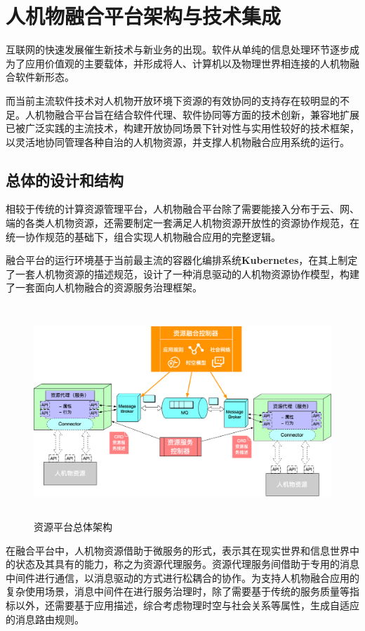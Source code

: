 \documentclass[a4paper, 12pt]{article}
\theoremstyle{definition}
\begin{document}
\section{人机物融合平台架构与技术集成} 

互联网的快速发展催生新技术与新业务的出现。软件从单纯的信息处理环节逐步成为了应用价值观的主要载体，并形成将人、计算机以及物理世界相连接的人机物融合软件新形态。

而当前主流软件技术对人机物开放环境下资源的有效协同的支持存在较明显的不足。人机物融合平台旨在结合软件代理、软件协同等方面的技术创新，兼容地扩展已被广泛实践的主流技术，构建开放协同场景下针对性与实用性较好的技术框架，以灵活地协同管理各种自治的人机物资源，并支撑人机物融合应用系统的运行。

\subsection{总体的设计和结构}

相较于传统的计算资源管理平台，人机物融合平台除了需要能接入分布于云、网、端的各类人机物资源，还需要制定一套满足人机物资源开放性的资源协作规范，在统一协作规范的基础下，组合实现人机物融合应用的完整逻辑。

融合平台的运行环境基于当前最主流的容器化编排系统\textbf{Kubernetes}，在其上制定了一套人机物资源的描述规范，设计了一种消息驱动的人机物资源协作模型，构建了一套面向人机物融合的资源服务治理框架。

\begin{figure}[ht]
 \centering
 \includegraphics[height=8cm]{images/overview_arch.jpg}
 \caption{资源平台总体架构}
 \label{fig:singleblock}
\end{figure}

在融合平台中，人机物资源借助于微服务的形式，表示其在现实世界和信息世界中的状态及其具有的能力，称之为资源代理服务。资源代理服务间借助于专用的消息中间件进行通信，以消息驱动的方式进行松耦合的协作。为支持人机物融合应用的复杂使用场景，消息中间件在进行服务治理时，除了需要基于传统的服务质量等指标以外，还需要基于应用描述，综合考虑物理时空与社会关系等属性，生成自适应的消息路由规则。
\end{document}
